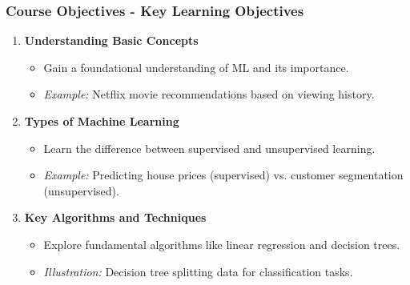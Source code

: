 \documentclass[aspectratio=169]{beamer}
\begin{document}
\begin{frame}[fragile]
    \frametitle{Course Objectives - Key Learning Objectives}
    \begin{enumerate}
        \item \textbf{Understanding Basic Concepts}
        \begin{itemize}
            \item Gain a foundational understanding of ML and its importance.
            \item \textit{Example:} Netflix movie recommendations based on viewing history.
        \end{itemize}

        \item \textbf{Types of Machine Learning}
        \begin{itemize}
            \item Learn the difference between supervised and unsupervised learning.
            \item \textit{Example:} Predicting house prices (supervised) vs. customer segmentation (unsupervised).
        \end{itemize}

        \item \textbf{Key Algorithms and Techniques}
        \begin{itemize}
            \item Explore fundamental algorithms like linear regression and decision trees.
            \item \textit{Illustration:} Decision tree splitting data for classification tasks.
        \end{itemize}
    \end{enumerate}
\end{frame}
\end{document}
